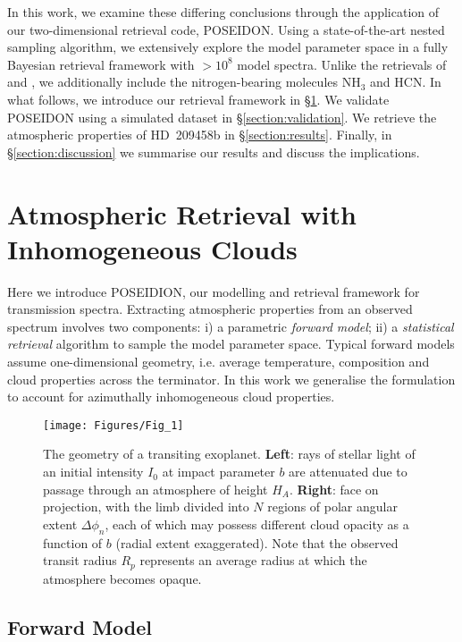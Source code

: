 \documentclass[fleqn,usenatbib]{mnras}
\begin{document}
In this work, we examine these differing conclusions through the application of our two-dimensional retrieval code, POSEIDON. Using a state-of-the-art nested sampling algorithm, we extensively explore the model parameter space in a fully Bayesian retrieval framework with $>$$10^{8}$ model spectra. Unlike the retrievals of \citet{Madhusudhan2014c} and \citet{Barstow2016}, we additionally include the nitrogen-bearing molecules $\mathrm{NH_3}$ and $\mathrm{HCN}$. In what follows, we introduce our retrieval framework in \S\ref{section:methods}. We validate POSEIDON using a simulated dataset in \S\ref{section:validation}. We retrieve the atmospheric properties of HD~209458b in \S\ref{section:results}. Finally, in \S\ref{section:discussion} we summarise our results and discuss the implications. 

\section{Atmospheric Retrieval with Inhomogeneous Clouds}\label{section:methods}

Here we introduce POSEIDION, our modelling and retrieval framework for transmission spectra. Extracting atmospheric properties from an observed spectrum involves two components: i) a parametric \emph{forward model}; ii) a \emph{statistical retrieval} algorithm to sample the model parameter space. Typical forward models assume one-dimensional geometry, i.e. average temperature, composition and cloud properties across the terminator. In this work we generalise the formulation to account for azimuthally inhomogeneous cloud properties.

\begin{figure*}
	\texttt{[image: Figures/Fig\_1]}
    \caption{The geometry of a transiting exoplanet. \textbf{Left}: rays of stellar light of an initial intensity $I_0$ at impact parameter $b$ are attenuated due to passage through an atmosphere of height $H_A$. \textbf{Right}: face on projection, with the limb divided into $N$ regions of polar angular extent $\Delta \phi_{n}$, each of which may possess different cloud opacity as a function of $b$ (radial extent exaggerated). Note that the observed transit radius $R_{p}$ represents an average radius at which the atmosphere becomes opaque.}
    \label{fig:Transit}
\end{figure*}

\newpage

\subsection{Forward Model}\label{subsec:forward_model}
\end{document}
